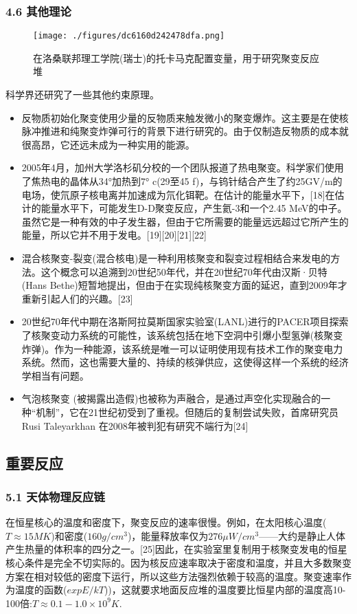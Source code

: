 \subsubsection{4.6 其他理论}
\begin{figure}[ht]
\centering
\texttt{[image: ./figures/dc6160d242478dfa.png]}
\caption{在洛桑联邦理工学院(瑞士)的托卡马克配置变量，用于研究聚变反应堆} \label{fig_HJB_6}
\end{figure}

科学界还研究了一些其他约束原理。
\begin{itemize}
\item 反物质初始化聚变使用少量的反物质来触发微小的聚变爆炸。这主要是在使核脉冲推进和纯聚变炸弹可行的背景下进行研究的。由于仅制造反物质的成本就很高昂，它还远未成为一种实用的能源。
\item 2005年4月，加州大学洛杉矶分校的一个团队报道了热电聚变。科学家们使用了焦热电的晶体从34°加热到7° c(29至45 f)，与钨针结合产生了约25GV/m的电场，使氘原子核电离并加速成为氘化铒靶。在估计的能量水平下，[18]在估计的能量水平下，可能发生D-D聚变反应，产生氦-3和一个2.45 MeV的中子。虽然它是一种有效的中子发生器，但由于它所需要的能量远远超过它所产生的能量，所以它并不用于发电。[19][20][21][22]
\item 混合核聚变-裂变(混合核电)是一种利用核聚变和裂变过程相结合来发电的方法。这个概念可以追溯到20世纪50年代，并在20世纪70年代由汉斯·贝特(Hans Bethe)短暂地提出，但由于在实现纯核聚变方面的延迟，直到2009年才重新引起人们的兴趣。[23]
\item 20世纪70年代中期在洛斯阿拉莫斯国家实验室(LANL)进行的PACER项目探索了核聚变动力系统的可能性，该系统包括在地下空洞中引爆小型氢弹(核聚变炸弹)。作为一种能源，该系统是唯一可以证明使用现有技术工作的聚变电力系统。然而，这也需要大量的、持续的核弹供应，这使得这样一个系统的经济学相当有问题。
\item 气泡核聚变 (被揭露出造假)也被称为声融合，是通过声空化实现融合的一种“机制”，它在21世纪初受到了重视。但随后的复制尝试失败，首席研究员Rusi Taleyarkhan 在2008年被判犯有研究不端行为[24]
\end{itemize}

\subsection{重要反应}
\subsubsection{5.1 天体物理反应链}
在恒星核心的温度和密度下，聚变反应的速率很慢。例如，在太阳核心温度($T\approx15 MK$)和密度($160 g/cm^3$)，能量释放率仅为$276 \mu W/cm^3$——大约是静止人体产生热量的体积率的四分之一。[25]因此，在实验室里复制用于核聚变发电的恒星核心条件是完全不切实际的。因为核反应速率取决于密度和温度，并且大多数聚变方案在相对较低的密度下运行，所以这些方法强烈依赖于较高的温度。聚变速率作为温度的函数($expE/kT$))，这就要求地面反应堆的温度要比恒星内部的温度高10-100倍:$T\approx0.1-1.0\times10^9K$.
